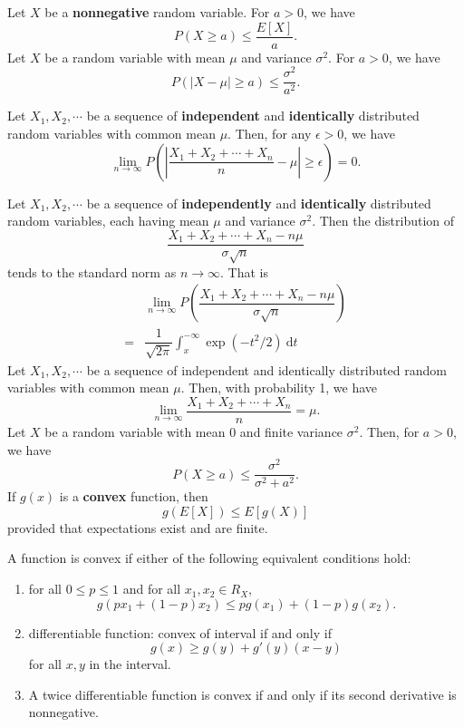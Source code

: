  Let \(X\) be a
\textbf{nonnegative} random variable. For \(a > 0\), we have 
\[P(X \geq a)\leq \dfrac{E[X]}{a}.\]
 Let \(X\) be a random variable
with mean \(\mu\) and variance \(\sigma^2\). For \(a > 0\), we have
\[P(|X-\mu| \geq a) \leq \dfrac{\sigma^2}{a^2}.\]

 Let \(X_1, X_2, \cdots\) be
a sequence of \textbf{independent} and \textbf{identically} distributed 
random variables with common mean \(\mu\). Then, for any \(\epsilon > 0\), we
have
\[\lim\limits_{n\rightarrow
    \infty}P\left(\left|\dfrac{X_1+X_2+\cdots+X_n}{n}-\mu\right|\geq
\epsilon\right) = 0.\]

 Let \(X_1, X_2, \cdots\) be a sequence of
\textbf{independently} and \textbf{identically} 
distributed random variables, each having mean \(\mu\) and variance
\(\sigma^2\). Then the distribution of 
\[\dfrac{X_1+X_2+\cdots+X_n-n\mu}{\sigma\sqrt{n}}\]
tends to the standard norm as \(n \rightarrow \infty\). That is 
\begin{align*}
&\lim\limits_{n\rightarrow
\infty}P\left(\dfrac{X_1+X_2+\cdots+X_n-n\mu}{\sigma\sqrt{n}}\right) \\ 
  =&\dfrac{1}{\sqrt{2\pi}}\int_{x}^{-\infty}\exp(-t^2/2)\ \mathrm{d}t
\end{align*}
 Let \(X_1, X_2, \cdots\)
be a sequence of independent and identically distributed random variables with
common mean \(\mu\). Then, with probability 1, we have
\[\lim\limits_{n\rightarrow\infty}\dfrac{X_1+X_2+\cdots+X_n}{n}=\mu.\]
 Let \(X\) be a
random variable with mean \(0\) and finite variance \(\sigma^2\). Then, for
\(a > 0\), we have
\[P(X \geq a) \leq \dfrac{\sigma^2}{\sigma^2+a^2}.\]
 If \(g(x)\) is a \textbf{convex}
function, then 
\[g(E[X]) \leq E[g(X)]\]
provided that expectations exist and are finite.

 A function is convex if either of the following
equivalent conditions hold:
\begin{enumerate}
  \item for all \(0 \leq p \leq 1\) and for all \(x_1, x_2 \in R_X\), 
    \[g(px_1 + (1-p)x_2)\leq pg(x_1) + (1-p)g(x_2).\]
  \item differentiable function: convex of interval if and only if 
    \[g(x) \geq g(y) + g'(y)(x-y)\]
    for all \(x, y\) in the interval.
  \item A twice differentiable function is convex if and only if its second
    derivative is nonnegative.
\end{enumerate}
